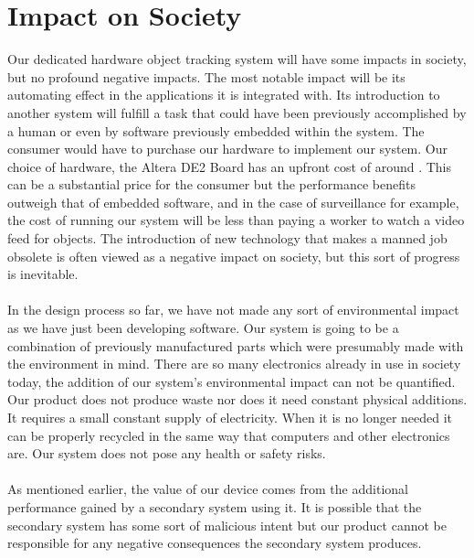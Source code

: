 \documentclass[12pt]{article} %
\begin{document}
\section{Impact on Society}
Our dedicated hardware object tracking system will have some impacts in society, but no profound negative impacts. The most notable impact will be its automating effect in the applications it is integrated with. Its introduction to another system will fulfill a task that could have been previously accomplished by a human or even by software previously embedded within the system. The consumer would have to purchase our hardware to implement our system. Our choice of hardware, the Altera DE2 Board has an upfront cost of around . This can be a substantial price for the consumer but the performance benefits outweigh that of embedded software, and in the case of surveillance for example, the cost of running our system will be less than paying a worker to watch a video feed for objects. The introduction of new technology that makes a manned job obsolete is often viewed as a negative impact on society, but this sort of progress is inevitable. \\\\
In the design process so far, we have not made any sort of environmental impact as we have just been developing software. Our system is going to be a combination of previously manufactured parts which were presumably made with the environment in mind. There are so many electronics already in use in society today, the addition of our system's environmental impact can not be quantified. Our product does not produce waste nor does it need constant physical additions. It requires a small constant supply of electricity. When it is no longer needed it can be properly recycled in the same way that computers and other electronics are. Our system does not pose any health or safety risks.\\\\
As mentioned earlier, the value of our device comes from the additional performance gained by a secondary system using it. It is possible that the secondary system has some sort of malicious intent but our product cannot be responsible for any negative consequences the secondary system produces. 
\end{document}
